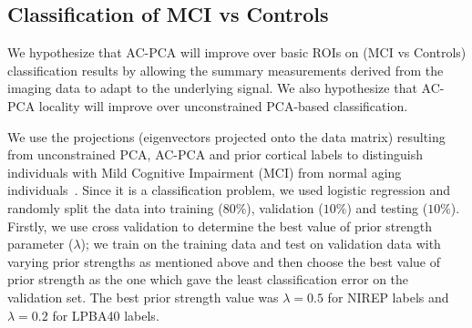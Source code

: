 \documentclass{llncs}
\begin{document}
{

\subsection{Classification of MCI vs Controls}

We hypothesize that AC-PCA will improve over basic ROIs on (MCI vs Controls) classification results by allowing the summary
measurements derived from the imaging data to adapt to the underlying signal.  We also hypothesize that AC-PCA locality will improve over
unconstrained PCA-based classification.

We use the projections (eigenvectors projected onto the data matrix) resulting from unconstrained PCA, AC-PCA and prior cortical labels to distinguish individuals with Mild Cognitive Impairment (MCI) from normal aging individuals~\cite{Zhou2011,Chen2010}. 
Since it is a classification problem, we used logistic regression and randomly split the data into training ($80\%$), validation ($10\%$) and testing ($10\%$). Firstly, we use cross validation to determine the best value of prior strength parameter ($\lambda$); we train on the training data and test on validation data with varying prior strengths as mentioned above and then choose the best value of prior strength as the one which gave the least classification error on the validation set.  The best prior strength value was $\lambda =0.5$ for NIREP labels and $\lambda=0.2$ for LPBA40 labels. 

}
\end{document}
